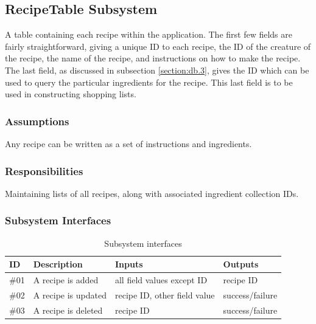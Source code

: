 \subsection{RecipeTable Subsystem}\label{section:db.4}
A table containing each recipe within the application.  The first few fields are fairly straightforward, giving a unique ID to each recipe, the ID of the creature of the recipe, the name of the recipe, and instructions on how to make the recipe.  The last field, as discussed in subsection \ref{section:db.3}, gives the ID which can be used to query the particular ingredients for the recipe.  This last field is to be used in constructing shopping lists.


\subsubsection{Assumptions}
Any recipe can be written as a set of instructions and ingredients.

\subsubsection{Responsibilities}
Maintaining lists of all recipes, along with associated ingredient collection IDs.


\subsubsection{Subsystem Interfaces}
\begin {table}[H]
\caption {Subsystem interfaces} 
\begin{center}
    \begin{tabular}{ | p{1cm} | p{6cm} | p{3cm} | p{3cm} |}
    \hline
    ID & Description & Inputs & Outputs \\ \hline
    \#01 & A recipe is added & all field values except ID & recipe ID  \\ \hline
    \#02 & A recipe is updated & recipe ID, other field value & success/failure  \\ \hline
    \#03 & A recipe is deleted & recipe ID & success/failure  \\ \hline
    \end{tabular}
\end{center}
\end{table}